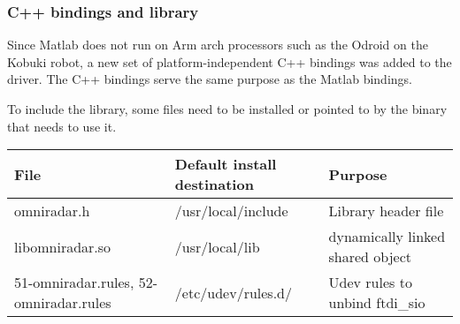 \subsubsection{C++ bindings and library}\label{c-bindings-and-library}

Since Matlab does not run on Arm arch processors such as the Odroid on
the Kobuki robot, a new set of platform-independent C++ bindings was
added to the driver. The C++ bindings serve the same purpose as the
Matlab bindings.

To include the library, some files need to be installed or pointed to by
the binary that needs to use it.

\begin{longtable}[]{@{}lll@{}}
\toprule
\begin{minipage}[b]{0.06\columnwidth}\raggedright\strut
File\strut
\end{minipage} & \begin{minipage}[b]{0.15\columnwidth}\raggedright\strut
Default install destination\strut
\end{minipage} & \begin{minipage}[b]{0.10\columnwidth}\raggedright\strut
Purpose\strut
\end{minipage}\tabularnewline
\midrule
\endhead
\begin{minipage}[t]{0.06\columnwidth}\raggedright\strut
omniradar.h\strut
\end{minipage} & \begin{minipage}[t]{0.15\columnwidth}\raggedright\strut
/usr/local/include\strut
\end{minipage} & \begin{minipage}[t]{0.10\columnwidth}\raggedright\strut
Library header file\strut
\end{minipage}\tabularnewline
\begin{minipage}[t]{0.06\columnwidth}\raggedright\strut
libomniradar.so\strut
\end{minipage} & \begin{minipage}[t]{0.15\columnwidth}\raggedright\strut
/usr/local/lib\strut
\end{minipage} & \begin{minipage}[t]{0.10\columnwidth}\raggedright\strut
dynamically linked shared object\strut
\end{minipage}\tabularnewline
\begin{minipage}[t]{0.06\columnwidth}\raggedright\strut
51-omniradar.rules, 52-omniradar.rules\strut
\end{minipage} & \begin{minipage}[t]{0.15\columnwidth}\raggedright\strut
/etc/udev/rules.d/\strut
\end{minipage} & \begin{minipage}[t]{0.10\columnwidth}\raggedright\strut
Udev rules to unbind ftdi\_sio\strut
\end{minipage}\tabularnewline
\bottomrule
\end{longtable}

